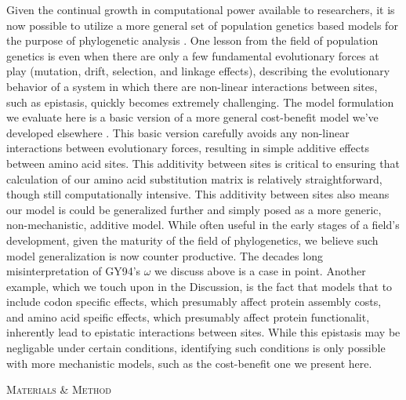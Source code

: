\documentclass[12pt,letterpaper]{article}
\renewcommand{\section}[1]{%
\bigskip
\begin{center}
\begin{Large}
\normalfont\scshape #1
\medskip
\end{Large}
\end{center}}
\renewcommand{\subsection}[1]{%
\bigskip
\begin{center}
\begin{large}
\normalfont\itshape #1
\end{large}
\end{center}}
\begin{document}
Given the continual growth in computational power available to researchers, it is now possible to utilize a more general set of population genetics based models for the purpose of phylogenetic analysis \citep[e.g.][]{HalpernAndBruno1998,RobinsonEtAl2003,LartillotAndPhilippe2004,RodrigueAndLartillot2014}.
One lesson from the field of population genetics is even when there are only a few fundamental evolutionary forces at play (mutation, drift, selection, and linkage effects), describing the evolutionary behavior of a system in which there are non-linear interactions between sites, such as epistasis, quickly becomes extremely challenging.
The model formulation we evaluate here is a basic version of a more general cost-benefit model we've developed elsewhere \cite{Gilchrist2007,GilchristEtAl11}.
This basic version carefully avoids any non-linear interactions between evolutionary forces, resulting in simple additive effects between amino acid sites.
This additivity between sites is critical to ensuring that calculation of our amino acid substitution matrix is relatively straightforward, though still computationally intensive.
This additivity between sites also means our model is could be generalized further and simply posed as a more generic, non-mechanistic, additive model.
While often useful in the early stages of a field's development, given the maturity of the field of phylogenetics, we believe such model generalization is now counter productive.
The decades long misinterpretation of GY94's $\omega$ we discuss above is a case in point.
Another example, which we touch upon in the Discussion, is the fact that models that to include codon specific effects, which presumably affect protein assembly costs, and amino acid speific effects, which presumably affect protein functionalit, inherently lead to epistatic interactions between sites.
While this epistasis may be negligable under certain conditions, identifying such conditions is only possible with more mechanistic models, such as the cost-benefit one we present here.


\section{Materials \& Method}

\end{document}
